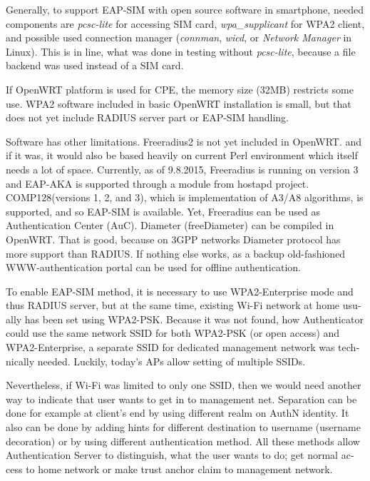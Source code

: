 \documentclass[12pt,a4paper,english]{tutthesis}
\begin{document}
\begin{otherlanguage}{english}
Generally, to support EAP-SIM  with open source software in 
smartphone, needed components are \emph{pcsc-lite} for accessing SIM card, \emph{wpa\_supplicant} for
WPA2 client, and possible used connection manager (\emph{connman},
\emph{wicd}, or \emph{Network Manager} in Linux). This is in line, what was done in testing without \emph{pcsc-lite},
because a file backend was used instead of a SIM card.




If OpenWRT platform is used for CPE, the memory size (32MB) restricts
some use.
WPA2 software included in basic OpenWRT installation is small,
but that does not yet include RADIUS server part or EAP-SIM handling.

Software has other limitations. Freeradius2 is not yet included  in OpenWRT.
and if it was, it would also be based heavily on current Perl environment which
itself needs a lot of space.
Currently, as of 9.8.2015, Freeradius is running on version 3 and
EAP-AKA is supported through a module from hostapd project.
COMP128(versions 1, 2, and 3), which is implementation  of A3/A8
algorithms, is  supported\cite{freeradius2}, and so EAP-SIM is available.
Yet, Freeradius can be used as Authentication Center (AuC).
Diameter (freeDiameter) can be compiled in OpenWRT. That is good,
because on 3GPP networks Diameter protocol has more support than RADIUS.
If nothing else works, as a backup old-fashioned WWW-authentication
portal can be used for offline authentication.










To enable EAP-SIM method, it is necessary to use WPA2-Enterprise mode
and thus RADIUS server, but at the same time, existing Wi-Fi network at
home usually has been set using WPA2-PSK.
Because it was not found, how Authenticator could use the same network
SSID for both WPA2-PSK (or open access) and WPA2-Enterprise, a
separate SSID for dedicated management network was technically needed.
Luckily, today's APs allow setting of multiple SSIDs.

Nevertheless, if Wi-Fi was limited to only one SSID, then we would
need another 
way to indicate that user wants to get in to management net. 
Separation can be done for example at client's  end by using different realm on
AuthN identity. It also can be done by adding hints for different destination to
username (username decoration) or by using different authentication
method. All these methods allow Authentication Server to distinguish, what the user
wants to do; get normal access to home network or make trust anchor claim to 
management network.


\end{otherlanguage}
\end{document}
